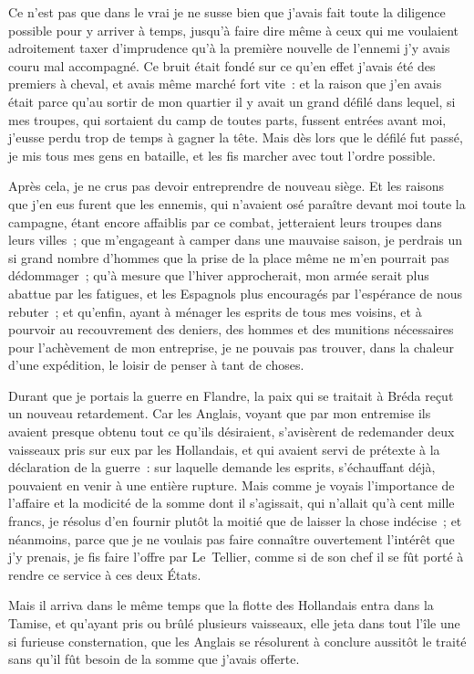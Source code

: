 \documentclass[french,twoside]{book} %
\begin{document}
Ce n’est pas que dans le vrai je ne susse bien que j’avais fait toute la diligence possible pour y arriver à temps, jusqu’à faire dire même à ceux qui me voulaient adroitement taxer d’imprudence qu’à la première nouvelle de l’ennemi j’y avais couru mal accompagné. Ce bruit était fondé sur ce qu’en effet j’avais été des premiers à cheval, et avais même marché fort vite : et la raison que j’en avais était parce qu’au sortir de mon quartier il y avait un grand défilé dans lequel, si mes troupes, qui sortaient du camp de toutes parts, fussent entrées avant moi, j’eusse perdu trop de temps à gagner la tête. Mais dès lors que le défilé fut passé, je mis tous mes gens en bataille, et les fis marcher avec tout l’ordre possible.\par
Après cela, je ne crus pas devoir entreprendre de nouveau siège. Et les raisons que j’en eus furent que les ennemis, qui n’avaient osé paraître devant moi toute la campagne, étant encore affaiblis par ce combat, jetteraient leurs troupes dans leurs villes ; que m’engageant à camper dans une mauvaise saison, je perdrais un si grand nombre d’hommes que la prise de la place même ne m’en pourrait pas dédommager ; qu’à mesure que l’hiver approcherait, mon armée serait plus abattue par les fatigues, et les Espagnols plus encouragés par l’espérance de nous rebuter ; et qu’enfin, ayant à ménager les esprits de tous mes voisins, et à pourvoir au recouvrement des deniers, des hommes et des munitions nécessaires pour l’achèvement de mon entreprise, je ne pouvais pas trouver, dans la chaleur d’une expédition, le loisir de penser à tant de choses.\par
Durant que je portais la guerre en Flandre, la paix qui se traitait à Bréda reçut un nouveau retardement. Car les Anglais, voyant que par mon entremise ils avaient presque obtenu tout ce qu’ils désiraient, s’avisèrent de redemander deux vaisseaux pris sur eux par les Hollandais, et qui avaient servi de prétexte à la déclaration de la guerre : sur laquelle demande les esprits, s’échauffant déjà, pouvaient en venir à une entière rupture. Mais comme je voyais l’importance de l’affaire et la modicité de la somme dont il s’agissait, qui n’allait qu’à cent mille francs, je résolus d’en fournir plutôt la moitié que de laisser la chose indécise ; et néanmoins, parce que je ne voulais pas faire connaître ouvertement l’intérêt que j’y prenais, je fis faire l’offre par Le Tellier, comme si de son chef il se fût porté à rendre ce service à ces deux États.\par
Mais il arriva dans le même temps que la flotte des Hollandais entra dans la Tamise, et qu’ayant pris ou brûlé plusieurs vaisseaux, elle jeta dans tout l’île une si furieuse consternation, que les Anglais se résolurent à conclure aussitôt le traité sans qu’il fût besoin de la somme que j’avais offerte.\par
\end{document}
